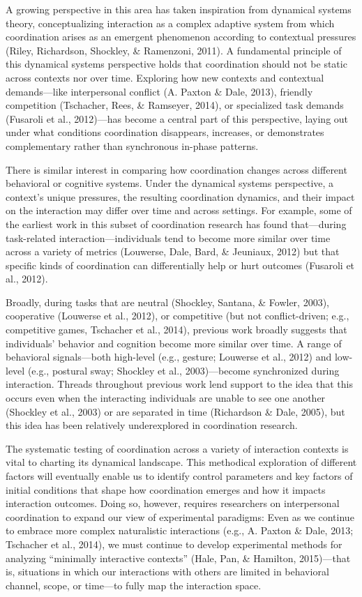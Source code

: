 \documentclass[10pt, letterpaper]{article}
\begin{document}
A growing perspective in this area has taken inspiration from dynamical
systems theory, conceptualizing interaction as a complex adaptive system
from which coordination arises as an emergent phenomenon according to
contextual pressures (Riley, Richardson, Shockley, \& Ramenzoni, 2011).
A fundamental principle of this dynamical systems perspective holds that
coordination should not be static across contexts nor over time.
Exploring how new contexts and contextual demands---like interpersonal
conflict (A. Paxton \& Dale, 2013), friendly competition (Tschacher,
Rees, \& Ramseyer, 2014), or specialized task demands (Fusaroli et al.,
2012)---has become a central part of this perspective, laying out under
what conditions coordination disappears, increases, or demonstrates
complementary rather than synchronous in-phase patterns.

There is similar interest in comparing how coordination changes across
different behavioral or cognitive systems. Under the dynamical systems
perspective, a context's unique pressures, the resulting coordination
dynamics, and their impact on the interaction may differ over time and
across settings. For example, some of the earliest work in this subset
of coordination research has found that---during task-related
interaction---individuals tend to become more similar over time across a
variety of metrics (Louwerse, Dale, Bard, \& Jeuniaux, 2012) but that
specific kinds of coordination can differentially help or hurt outcomes
(Fusaroli et al., 2012).

Broadly, during tasks that are neutral (Shockley, Santana, \& Fowler,
2003), cooperative (Louwerse et al., 2012), or competitive (but not
conflict-driven; e.g., competitive games, Tschacher et al., 2014),
previous work broadly suggests that individuals' behavior and cognition
become more similar over time. A range of behavioral signals---both
high-level (e.g., gesture; Louwerse et al., 2012) and low-level (e.g.,
postural sway; Shockley et al., 2003)---become synchronized during
interaction. Threads throughout previous work lend support to the idea
that this occurs even when the interacting individuals are unable to see
one another (Shockley et al., 2003) or are separated in time (Richardson
\& Dale, 2005), but this idea has been relatively underexplored in
coordination research.

The systematic testing of coordination across a variety of interaction
contexts is vital to charting its dynamical landscape. This methodical
exploration of different factors will eventually enable us to identify
control parameters and key factors of initial conditions that shape how
coordination emerges and how it impacts interaction outcomes. Doing so,
however, requires researchers on interpersonal coordination to expand
our view of experimental paradigms: Even as we continue to embrace more
complex naturalistic interactions (e.g., A. Paxton \& Dale, 2013;
Tschacher et al., 2014), we must continue to develop experimental
methods for analyzing ``minimally interactive contexts'' (Hale, Pan, \&
Hamilton, 2015)---that is, situations in which our interactions with
others are limited in behavioral channel, scope, or time---to fully map
the interaction space.
\end{document}
